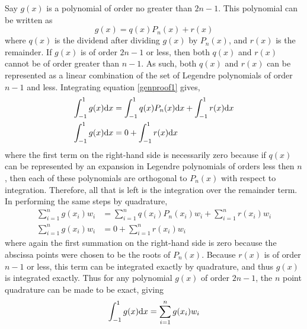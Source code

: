 \documentclass[preprint]{revtex4}
\newcommand{\dx}{{\rm d}x}
\newcommand{\intunit}{\ensuremath{\int_{-1}^{1}}}
\newcommand{\sumunit}{\ensuremath{\sum_{i=1}^{n}}}
\begin{document}
Say $g(x)$ is a polynomial of order no greater than $2n-1$. This polynomial can be
written as 
\begin{equation}
\label{genproof1}
g(x)=q(x)P_n(x)+r(x)
\end{equation}
where $q(x)$ is the dividend after dividing $g(x)$ by $P_n(x)$, and $r(x)$ is the 
remainder. If $g(x)$ is of order $2n-1$ or less, then both $q(x)$ and $r(x)$ cannot
be of order greater than $n-1$. As such, both $q(x)$ and $r(x)$ can be represented
as a linear combination of the set of Legendre polynomials of order $n-1$ and less. 
Integrating equation \ref{genproof1} gives, 
\begin{align}
\label{genproof2}
\intunit g(x)\dx &= \intunit q(x)P_n(x)\dx + \intunit r(x)\dx \\
\intunit g(x)\dx &= 0+\intunit r(x)\dx
\end{align}
where the first term on the right-hand side is necessarily zero because if $q(x)$ 
can be represented by an expansion in Legendre polynomials of orders less then $n$, 
then each of these polynomials are orthogonal to $P_n(x)$ with respect to integration.
Therefore, all that is left is the integration over the remainder term. 
In performing the same steps by quadrature, 
\begin{align}
\label{genproof3}
\sumunit g(x_i)w_i &= \sumunit q(x_i)P_n(x_i)w_i + \sumunit r(x_i)w_i \\
\sumunit g(x_i)w_i &= 0+\sumunit r(x_i)w_i
\end{align}
where again the first summation on the right-hand side is zero because the 
abscissa points were chosen to be the roots of $P_n(x)$. Because $r(x)$ is of
order $n-1$ or less, this term can be integrated exactly by quadrature, and thus
$g(x)$ is integrated exactly. Thus for any polynomial $g(x)$ of order $2n-1$, 
the $n$ point quadrature can be made to be exact, giving
\begin{equation}
\intunit g(x)\dx = \sumunit g(x_i)w_i
\end{equation}

\end{document}
